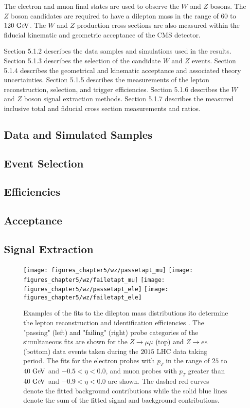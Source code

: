 The electron and muon final states are used to observe the $W$ and $Z$ bosons. The $Z$ boson candidates are required to have a dilepton mass in the range of $60$ to $120~\mathrm{Ge\kern -0.1em V}$. The $W$ and $Z$ production cross sections are also measured within the fiducial kinematic and geometric acceptance of the CMS detector.   

Section 5.1.2 describes the data samples and simulations used in the results. Section 5.1.3 describes the selection of the candidate $W$ and $Z$ events. Section 5.1.4 describes the geometrical and kinematic acceptance and associated theory uncertainties. Section 5.1.5 describes the measurements of the lepton reconstruction, selection, and trigger efficiencies. Section 5.1.6 describes the $W$ and $Z$ boson signal extraction methods. Section 5.1.7 describes the measured inclusive total and fiducial cross section measurements and ratios.  



\subsection{Data and Simulated Samples}



\subsection{Event Selection}

\subsection{Efficiencies}

\subsection{Acceptance}

\subsection{Signal Extraction}

\begin{figure}[h]
\centering
\texttt{[image: figures\_chapter5/wz/passetapt\_mu]}
\texttt{[image: figures\_chapter5/wz/failetapt\_mu]}
\texttt{[image: figures\_chapter5/wz/passetapt\_ele]}
\texttt{[image: figures\_chapter5/wz/failetapt\_ele]}
\caption{Examples of the fits to the dilepton mass distributions ito determine the lepton reconstruction and identification efficiencies . The "passing" (left) and "failing" (right) probe categories of the simultaneous fits are shown for the $Z\rightarrow \mu\mu$ (top) and $Z\rightarrow ee$ (bottom) data events taken during the $2015$ LHC data taking period. The fits for the electron probes with $p_{T}$ in the range of $25$ to $40~\mathrm{Ge\kern -0.1em V}$ and $-0.5<\eta<0.0$, and muon probes with $p_{T}$ greater than $40~\mathrm{Ge\kern -0.1em V}$ and $-0.9<\eta<0.0$ are shown. The dashed red curves denote the fitted background contributions while the solid blue lines denote the sum of the fitted signal and background contributions.}
\label{fig:tgp}
\end{figure}

